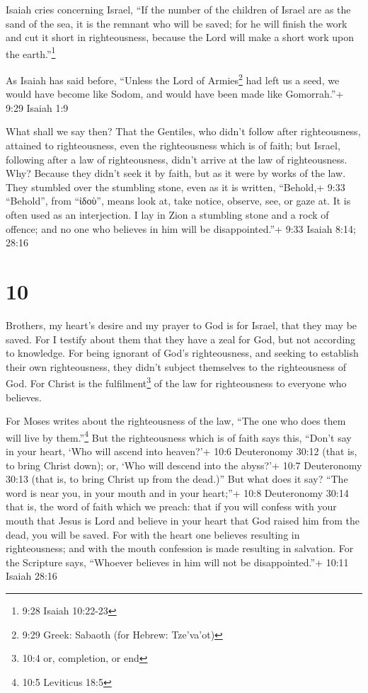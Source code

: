  Isaiah cries concerning Israel, ``If the number of the
children of Israel are as the sand of the sea, it is the remnant who
will be saved;  for he will finish the work and cut it
short in righteousness, because the Lord will make a short work upon the
earth.''\footnote{9:28 Isaiah 10:22-23}

 As Isaiah has said before, ``Unless the Lord of
Armies\footnote{9:29 Greek: Sabaoth (for Hebrew: Tze'va'ot)} had left us
a seed, we would have become like Sodom, and would have been made like
Gomorrah.''+ 9:29 Isaiah 1:9

 What shall we say then? That the Gentiles, who didn't
follow after righteousness, attained to righteousness, even the
righteousness which is of faith;  but Israel, following
after a law of righteousness, didn't arrive at the law of righteousness.
 Why? Because they didn't seek it by faith, but as it were
by works of the law. They stumbled over the stumbling stone,
 even as it is written, ``Behold,+ 9:33 ``Behold'', from
``ἰδοὺ'', means look at, take notice, observe, see, or gaze at. It is
often used as an interjection. I lay in Zion a stumbling stone and a
rock of offence; and no one who believes in him will be disappointed.''+
9:33 Isaiah 8:14; 28:16

\hypertarget{section-9}{%
\section{10}\label{section-9}}

 Brothers, my heart's desire and my prayer to God is for
Israel, that they may be saved.  For I testify about them
that they have a zeal for God, but not according to knowledge.
 For being ignorant of God's righteousness, and seeking to
establish their own righteousness, they didn't subject themselves to the
righteousness of God.  For Christ is the
fulfilment\footnote{10:4 or, completion, or end} of the law for
righteousness to everyone who believes.

 For Moses writes about the righteousness of the law, ``The
one who does them will live by them.''\footnote{10:5 Leviticus 18:5}
 But the righteousness which is of faith says this, ``Don't
say in your heart, `Who will ascend into heaven?'+ 10:6 Deuteronomy
30:12 (that is, to bring Christ down);  or, `Who will
descend into the abyss?'+ 10:7 Deuteronomy 30:13 (that is, to bring
Christ up from the dead.)''  But what does it say? ``The
word is near you, in your mouth and in your heart;''+ 10:8 Deuteronomy
30:14 that is, the word of faith which we preach:  that if
you will confess with your mouth that Jesus is Lord and believe in your
heart that God raised him from the dead, you will be saved.
 For with the heart one believes resulting in
righteousness; and with the mouth confession is made resulting in
salvation.  For the Scripture says, ``Whoever believes in
him will not be disappointed.''+ 10:11 Isaiah 28:16

